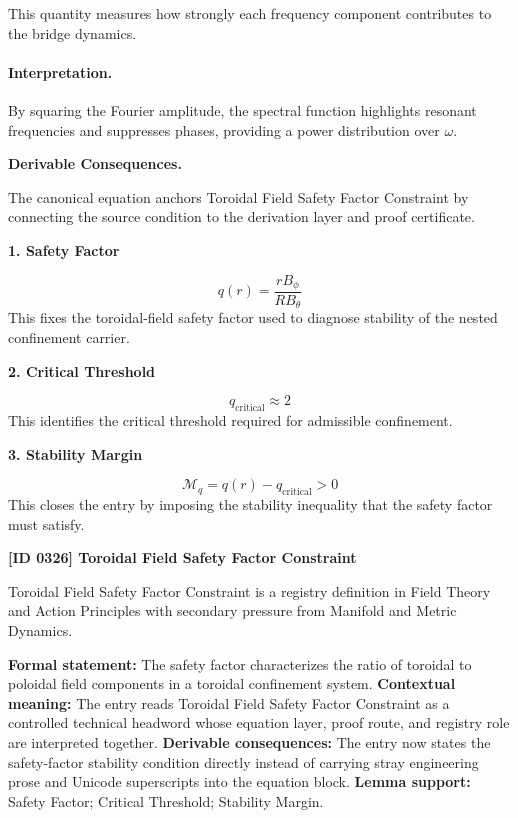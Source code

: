 This quantity measures how strongly each frequency component contributes to the bridge dynamics.

\paragraph{Interpretation.}

By squaring the Fourier amplitude, the spectral function highlights resonant frequencies and suppresses phases, providing a power distribution over $\omega$.

\par\vspace{0.35em}
\noindent\textbf{Derivable Consequences.}\quad
\begingroup
\footnotesize
\raggedright
The canonical equation anchors Toroidal Field Safety Factor Constraint by connecting the source condition to the derivation layer and proof certificate.
\par\endgroup

\noindent\textbf{1. Safety Factor}\par
\[
q(r)=\frac{rB_{\phi}}{RB_{\theta}}
\]
\noindent This fixes the toroidal-field safety factor used to diagnose stability of the nested confinement carrier.\par
\noindent\textbf{2. Critical Threshold}\par
\[
q_{\mathrm{critical}}\approx2
\]
\noindent This identifies the critical threshold required for admissible confinement.\par
\noindent\textbf{3. Stability Margin}\par
\[
\mathcal{M}_{q}=q(r)-q_{\mathrm{critical}}>0
\]
\noindent This closes the entry by imposing the stability inequality that the safety factor must satisfy.\par

\clearpage
\noindent\textbf{[ID 0326] Toroidal Field Safety Factor Constraint}\par
\vspace{0.35em}
\begingroup\small
{}
Toroidal Field Safety Factor Constraint is a registry definition in Field Theory and Action Principles with secondary pressure from Manifold and Metric Dynamics.

\begingroup\footnotesize\setlength{\emergencystretch}{3em}\sloppy
\textbf{Formal statement:} The safety factor characterizes the ratio of toroidal to poloidal field components in a toroidal confinement system. \textbf{Contextual meaning:} The entry reads Toroidal Field Safety Factor Constraint as a controlled technical headword whose equation layer, proof route, and registry role are interpreted together. \textbf{Derivable consequences:} The entry now states the safety-factor stability condition directly instead of carrying stray engineering prose and Unicode superscripts into the equation block. \textbf{Lemma support:} Safety Factor; Critical Threshold; Stability Margin.\par
\endgroup

